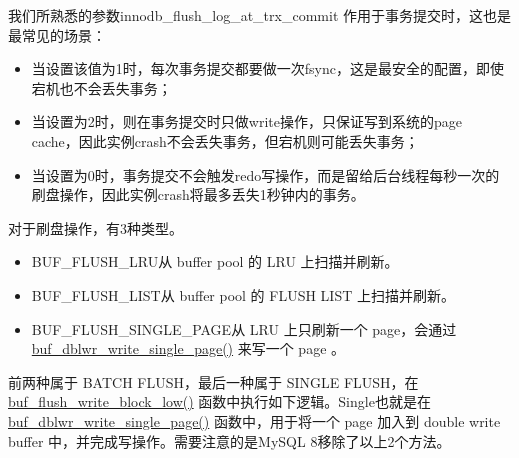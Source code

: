 \documentclass[../../../interview-questions.tex]{subfiles}
\begin{document}
我们所熟悉的参数innodb\_flush\_log\_at\_trx\_commit 作用于事务提交时，这也是最常见的场景：

\begin{itemize}
    \item {当设置该值为1时，每次事务提交都要做一次fsync，这是最安全的配置，即使宕机也不会丢失事务；}
    \item {当设置为2时，则在事务提交时只做write操作，只保证写到系统的page cache，因此实例crash不会丢失事务，但宕机则可能丢失事务；}
    \item {当设置为0时，事务提交不会触发redo写操作，而是留给后台线程每秒一次的刷盘操作，因此实例crash将最多丢失1秒钟内的事务。}
\end{itemize}

对于刷盘操作，有3种类型。

\begin{itemize}
    \item {BUF\_FLUSH\_LRU}从 buffer pool 的 LRU 上扫描并刷新。
    \item {BUF\_FLUSH\_LIST}从 buffer pool 的 FLUSH LIST 上扫描并刷新。
    \item {BUF\_FLUSH\_SINGLE\_PAGE}从 LRU 上只刷新一个 page，会通过 \url{buf\_dblwr\_write\_single\_page()} 来写一个 page 。
\end{itemize}

前两种属于 BATCH FLUSH，最后一种属于 SINGLE FLUSH，在 \url{buf\_flush\_write\_block\_low()} 函数中执行如下逻辑。Single也就是在 \url{buf\_dblwr\_write\_single\_page()} 函数中，用于将一个 page 加入到 double write buffer 中，并完成写操作。需要注意的是MySQL 8移除了以上2个方法。
\end{document}
